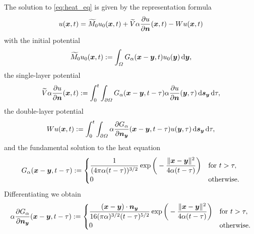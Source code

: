 \documentclass[a4paper,11pt]{article}
\begin{document}
The solution to \eqref{eq:heat_eq} is given by the representation formula
\begin{equation}
  \label{eq:repr}
  u({{\bm{x}}},t) = \widetilde{M}_0 u_0({{\bm{x}}},t) + \widetilde V \alpha\frac{\partial u}{\partial {\ensuremath{{\bm{n}}}}}({{\bm{x}}},t) - Wu({{\bm{x}}},t)
\end{equation}
with the initial potential
\begin{equation*}
  \widetilde{M}_0 u_0({{\bm{x}}},t) := \int_\Omega G_\alpha({{\bm{x}}}-{{\bm{y}}},t) u_0({{\bm{y}}}) \,{\mathrm{d}}{{\bm{y}}},
\end{equation*}
the single-layer potential
\begin{equation*}
  \widetilde V \alpha\frac{\partial u}{\partial {\ensuremath{{\bm{n}}}}} ({{\bm{x}}},t) := \int_0^t \int_{\partial\Omega} G_\alpha({{\bm{x}}}-{{\bm{y}}},t-\tau) \alpha\frac{\partial u}{\partial {\ensuremath{{\bm{n}}}}} ({{\bm{y}}},\tau) \,{\mathrm{d}}{{\bm{s}}}_{{\bm{y}}} \,{\mathrm{d}}\tau,
\end{equation*}
the double-layer potential
\begin{equation*}
  W u ({{\bm{x}}},t) := \int_0^t \int_{\partial\Omega} \alpha\frac{\partial G_\alpha}{\partial {\ensuremath{{\bm{n}}}}_{{\bm{y}}}}({{\bm{x}}}-{{\bm{y}}},t-\tau) u({{\bm{y}}},\tau) \,{\mathrm{d}}{{\bm{s}}}_{{\bm{y}}} \,{\mathrm{d}}\tau,
\end{equation*}
and the fundamental solution to the heat equation
\begin{equation*}
  G_\alpha({{\bm{x}}}-{{\bm{y}}},t-\tau) :=
  \begin{cases}
  \displaystyle
  \frac{1}{(4\pi\alpha(t-\tau))^{3/2}}\exp\bigg( -\frac{\|{{\bm{x}}}-{{\bm{y}}}\|^2}{4\alpha(t-\tau)} \bigg) & \text{for } t > \tau, \\
  0 & \text{otherwise.}
  \end{cases}
\end{equation*}
Differentiating we obtain
\begin{equation*}
  \alpha\frac{\partial G_\alpha}{\partial {\ensuremath{{\bm{n}}}}_{{\bm{y}}}}({{\bm{x}}}-{{\bm{y}}},t-\tau) :=
  \begin{cases}
  \displaystyle
  \frac{({{\bm{x}}}-{{\bm{y}}})\cdot {\ensuremath{{\bm{n}}}}_{{\bm{y}}}}{16(\pi\alpha)^{3/2}(t-\tau)^{5/2}}\exp\bigg( -\frac{\|{{\bm{x}}}-{{\bm{y}}}\|^2}{4\alpha(t-\tau)} \bigg) & \text{for } t > \tau, \\
  0 & \text{otherwise.}
  \end{cases}
\end{equation*}  

\end{document}
